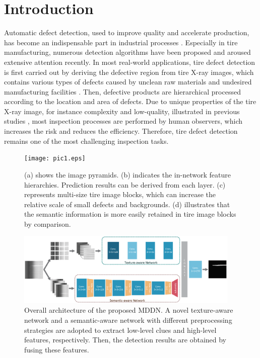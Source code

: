 \documentclass{article}
\begin{document}
\section{Introduction}
\label{sec:intro}
Automatic defect detection, used to improve quality and accelerate production, has become an indispensable part in industrial processes \cite{kumar2008computer,li2016deformable}. Especially in tire manufacturing, numerous detection algorithms have been proposed \cite{zhang2013texture,zhang2018tire,xiang2014dictionary} and aroused extensive attention recently. In most real-world applications, tire defect detection is first carried out by deriving the defective region from tire X-ray images, which contains various types of defects caused by unclean raw materials and undesired manufacturing facilities \cite{guo2016defect}. Then, defective products are hierarchical processed according to the location and area of defects. Due to unique properties of the tire X-ray image, for instance complexity and low-quality, illustrated in previous studies \cite{zhang2013defect,wang2019tire}, most inspection processes are performed by human observers, which increases the risk and reduces the efficiency. Therefore, tire defect detection remains one of the most challenging inspection tasks.
\begin{figure}[t]
  \centering
  \centerline{\texttt{[image: pic1.eps]}}
  \caption{(a) shows the image pyramids. (b) indicates the in-network feature hierarchies. Prediction results can be derived from each layer. (c) represents multi-size tire image blocks, which can increase the relative scale of small defects and backgrounds. (d) illustrates that the semantic information is more easily retained in tire image blocks by comparison.}
  \label{fig1}
\end{figure}
\begin{figure}[t]
  \centering
  \centerline{\includegraphics[width=0.95\textwidth]{pic2-4.eps}}
  \caption{Overall architecture of the proposed MDDN. A novel texture-aware network and a semantic-aware network with different preprocessing strategies are adopted to extract low-level clues and high-level features, respectively. Then, the detection results are obtained by fusing these features.}
  \label{fig2}
\end{figure}
\end{document}
